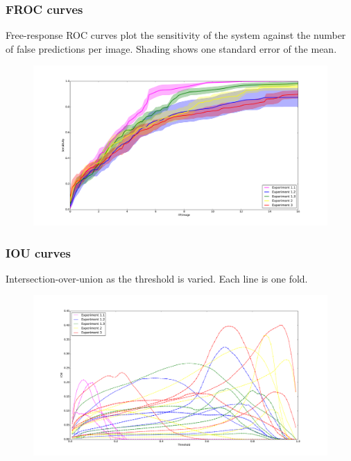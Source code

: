 \documentclass{beamer}
\begin{document}
    \begin{frame}
        \frametitle{FROC curves}
           Free-response ROC curves plot the sensitivity of the system against the number of false predictions per image. Shading shows one standard error of the mean.
        \begin{figure}
	        \centering
		        \includegraphics[width=\textwidth]{plots/FROC_plus_std.pdf}
        \end{figure}
    \end{frame}
    
    \begin{frame}
        \frametitle{IOU curves}
        Intersection-over-union as the threshold is varied. Each line is one fold.
        
        \begin{figure}
	        \centering
		        \includegraphics[width=\textwidth]{plots/IOU_all_folds.pdf}
        \end{figure}
    \end{frame}
    
\end{document}
